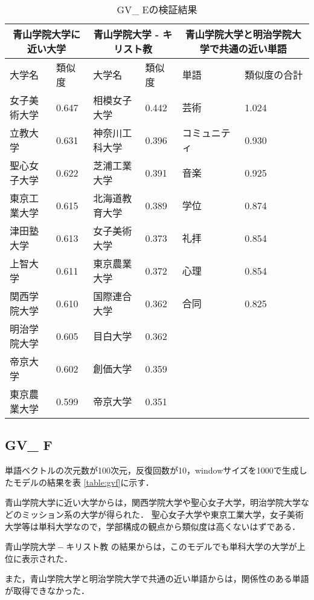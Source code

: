 \begin{table}[H]
\caption{GV\_ Eの検証結果}
\centering
\footnotesize
\begin{tabular}{ll|ll|ll}
\hline
\multicolumn{2}{c}{青山学院大学に近い大学} & \multicolumn{2}{c}{青山学院大学 - キリスト教} & \multicolumn{2}{c}{青山学院大学と明治学院大学で共通の近い単語}
\\ \hline
大学名 & 類似度 & 大学名 & 類似度 & 単語 & 類似度の合計
\\ \hline \hline
女子美術大学 & 0.647 & 相模女子大学 & 0.442 & 芸術 & 1.024\\
立教大学 & 0.631 & 神奈川工科大学 & 0.396 & コミュニティ & 0.930\\
聖心女子大学 & 0.622 & 芝浦工業大学 & 0.391 & 音楽 & 0.925\\
東京工業大学 & 0.615 & 北海道教育大学 & 0.389 & 学位 & 0.874\\
津田塾大学 & 0.613 & 女子美術大学 & 0.373 & 礼拝 & 0.854\\
上智大学 & 0.611 & 東京農業大学 & 0.372 & 心理 & 0.854\\
関西学院大学 & 0.610 & 国際連合大学 & 0.362 & 合同 & 0.825\\
明治学院大学 & 0.605 & 目白大学 & 0.362 & & \\
帝京大学 & 0.602 & 創価大学 & 0.359 & & \\
東京農業大学 & 0.599 & 帝京大学 & 0.351 & & \\ \hline
\end{tabular}
\label{table:gve}
\end{table}

\subsection{GV\_ F}
単語ベクトルの次元数が100次元，反復回数が10，windowサイズを1000で生成したモデルの結果を表 \ref{table:gvf}に示す．

青山学院大学に近い大学からは，関西学院大学や聖心女子大学，明治学院大学などのミッション系の大学が得られた．
聖心女子大学や東京工業大学，女子美術大学等は単科大学なので，学部構成の観点から類似度は高くないはずである．

$ 青山学院大学 - キリスト教 $ の結果からは，このモデルでも単科大学の大学が上位に表示された．

また，青山学院大学と明治学院大学で共通の近い単語からは，関係性のある単語が取得できなかった．

